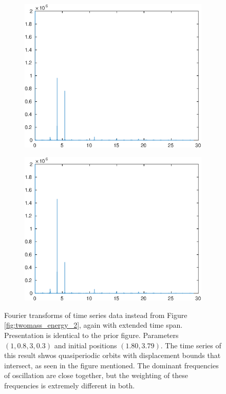 \begin{figure}[h!]
    \begin{subfigure}[b]{0.5\textwidth}
        \includegraphics[width=\textwidth]{voiced_sounds/case_2/other_stable_resulta.eps}
    \end{subfigure}
    \begin{subfigure}[b]{0.5\textwidth}
        \includegraphics[width=\textwidth]{voiced_sounds/case_2/other_stable_resultb.eps}
    \end{subfigure} %
    \caption{
        Fourier transforms of time series data instead from Figure \ref{fig:twomass_energy_2}, again with extended time span.
        Presentation is identical to the prior figure.
        Parameters \((1, 0.8, 3, 0.3)\) and initial positions $(1.80,3.79)$.
        The time series of this result shwos quasiperiodic orbits with displacement bounds that intersect, as seen in the figure mentioned.
        The dominant frequencies of oscillation are close together,
        but the weighting of these frequencies is extremely different in both.
    }
    \label{fig:twomass_fourier_second}
\end{figure}

